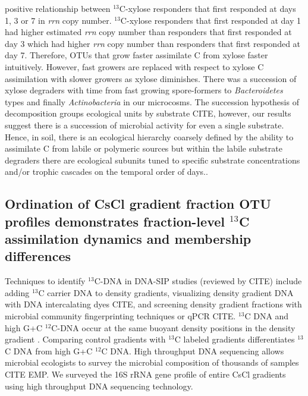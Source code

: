 positive relationship between $^{13}$C-xylose responders that first responded
at days 1, 3 or 7 in \textit{rrn} copy number. $^{13}$C-xylose responders that
first responded at day 1 had higher estimated \textit{rrn} copy number than
responders that first responded at day 3 which had higher \textit{rrn} copy
number than responders that first responded at day 7.  Therefore, OTUs that
grow faster assimilate C from xylose faster intuitively.  However, fast growers
are replaced with respect to xylose C assimilation with slower growers as
xylose diminishes. There was a succession of xylose degraders with time from
fast growing spore-formers to \textit{Bacteroidetes} types and finally
\textit{Actinobacteria} in our microcosms. The succession hypothesis of
decomposition groups ecological units by substrate CITE, however, our results
suggest there is a succession of microbial activity for even a single
substrate. Hence, in soil, there is an ecological hierarchy coarsely defined by
the ability to assimilate C from labile or polymeric sources but within the
labile substrate degraders there are ecological subunits tuned to specific
substrate concentrations and/or trophic cascades on the temporal order of
days..

\subsection{Ordination of CsCl gradient fraction OTU profiles demonstrates
fraction-level $^{13}$C assimilation dynamics and membership differences}
Techniques to identify $^{13}$C-DNA in DNA-SIP studies (reviewed by CITE)
include adding $^{13}$C carrier DNA to density gradients, visualizing
density gradient DNA with DNA intercalating dyes CITE, and screening
density gradient fractions with microbial community fingerprinting
techniques or qPCR CITE. $^{13}$C DNA and high G+C $^{12}$C-DNA occur at
the same buoyant density positions in the density gradient
\citep{Buckley_2007}. Comparing control gradients with $^{13}$C labeled
gradients differentiates $^{13}$C DNA from high G+C $^{12}$C DNA. High
throughput DNA sequencing allows microbial ecologists to survey the
microbial composition of thousands of samples CITE EMP. We surveyed the
16S rRNA gene profile of entire CsCl gradients using high throughput DNA
sequencing technology.

